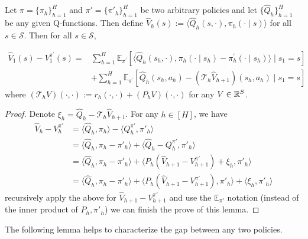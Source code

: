 \begin{lemma}\label{lem:evd}
	Let $\pi=\{\pi_h\}_{h=1}^H$ and $\pi'=\{\pi'_h\}_{h=1}^H$ be two arbitrary policies and let $\{\widehat{Q}_h\}_{h=1}^H$ be any given Q-functions. Then define $\widehat{V}_{h}(s):=\langle\widehat{Q}_{h}(s, \cdot), \pi_{h}(\cdot \mid s)\rangle$ for all $s\in\mathcal{S}$. Then for all $s\in\mathcal{S}$,
	
	\begin{equation}
	\begin{aligned}
	\widehat{V}_{1}(s)-V_{1}^{\pi^{\prime}}(s)=& \sum_{h=1}^{H} \mathbb{E}_{\pi^{\prime}}\left[\langle\widehat{Q}_{h}\left(s_{h}, \cdot\right), \pi_{h}\left(\cdot \mid s_{h}\right)-\pi_{h}^{\prime}\left(\cdot \mid s_{h}\right)\rangle \mid s_{1}=s\right] \\
	&+\sum_{h=1}^{H} \mathbb{E}_{\pi^{\prime}}\left[\widehat{Q}_{h}\left(s_{h}, a_{h}\right)-\left(\mathcal{T}_{h} \widehat{V}_{h+1}\right)\left(s_{h}, a_{h}\right) \mid s_{1}=s\right]
	\end{aligned}
	\end{equation}
	where $(\mathcal{T}_{h} V)(\cdot,\cdot):=r_h(\cdot,\cdot)+(P_hV)(\cdot,\cdot)$ for any $V\in\mathbb{R}^S$.
\end{lemma}


\begin{proof}
	
	Denote $\xi_h=\widehat{Q}_h-\mathcal{T}_h\widehat{V}_{h+1}$. For any $h\in[H]$, we have 
	\begin{align*}
	\widehat{V}_h-V^{\pi'}_h&=\langle \widehat{Q}_h,\pi_h\rangle-\langle {Q}^{\pi'}_h,\pi'_h\rangle\\
	&=\langle \widehat{Q}_h,\pi_h-\pi'_h\rangle+\langle \widehat{Q}_h-{Q}^{\pi'}_h,\pi'_h\rangle\\
	&=\langle \widehat{Q}_h,\pi_h-\pi'_h\rangle+\langle P_h(\widehat{V}_{h+1}-V^{\pi'}_{h+1})+\xi_h,\pi'_h\rangle\\
	&=\langle \widehat{Q}_h,\pi_h-\pi'_h\rangle+\langle P_h(\widehat{V}_{h+1}-V^{\pi'}_{h+1}),\pi'_h\rangle+
	\langle \xi_h,\pi'_h\rangle
	\end{align*}
	recursively apply the above for $\widehat{V}_{h+1}-V^{\pi'}_{h+1}$ and use the $\mathbb{E}_{\pi'}$ notation (instead of the inner product of $P_h,\pi'_h$) we can finish the prove of this lemma.
\end{proof}

The following lemma helps to characterize the gap between any two policies.

